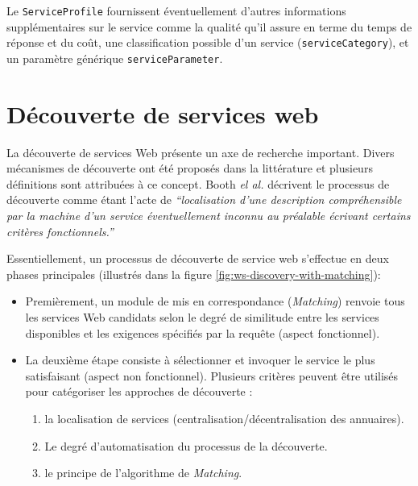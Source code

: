     Le \verb|ServiceProfile| fournissent éventuellement d'autres
    informations supplémentaires sur le service comme la qualité qu'il
    assure en terme du temps de réponse et du coût, une classification
    possible d'un service (\verb|serviceCategory|), et un paramètre
    générique \verb|serviceParameter|.

\newpage
\section{Découverte de services web}
\label{sec:ws-discovery}
La découverte de services Web présente un axe de recherche
important. Divers mécanismes de découverte ont été proposés dans la
littérature et plusieurs définitions sont attribuées à ce
concept. Booth \textit{el al.} \cite{booth2004web} décrivent le
processus de découverte comme étant l'acte de \textit{``localisation
  d'une description compréhensible par la machine d'un service
  éventuellement inconnu au préalable écrivant certains critères
  fonctionnels.''}



Essentiellement, un processus de découverte de service web s'effectue
en deux phases principales (illustrés dans la figure
\ref{fig:ws-discovery-with-matching}):

\SpecialItem
\begin{itemize}
\item Premièrement, un module de mis en correspondance
  (\textit{Matching}) renvoie tous les services Web candidats selon le
  degré de similitude entre les services disponibles et les exigences
  spécifiés par la requête (aspect fonctionnel).

\item La deuxième étape consiste à sélectionner et invoquer le service
  le plus satisfaisant (aspect non fonctionnel). Plusieurs critères
  peuvent être utilisés pour catégoriser les approches de découverte
  \cite{elie2010}:
\enddescription
  \begin{enumerate}
  \item la localisation de services (centralisation/décentralisation
    des annuaires).
  \item Le degré d'automatisation du processus de la découverte.
  \item le principe de l'algorithme de \textit{Matching}.
\end{enumerate}
\end{itemize}

